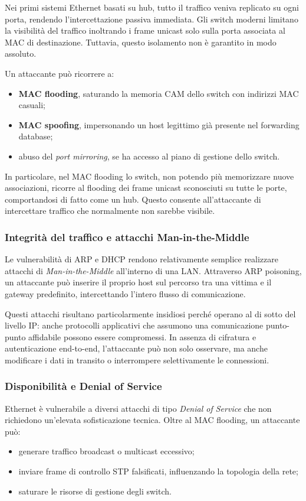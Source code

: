 Nei primi sistemi Ethernet basati su hub, tutto il traffico veniva replicato su ogni porta,
rendendo l’intercettazione passiva immediata.
Gli switch moderni limitano la visibilità del traffico inoltrando i frame unicast
solo sulla porta associata al MAC di destinazione.
Tuttavia, questo isolamento non è garantito in modo assoluto.

Un attaccante può ricorrere a:
\begin{itemize}
  \item \textbf{MAC flooding}, saturando la memoria CAM dello switch con indirizzi MAC casuali;
  \item \textbf{MAC spoofing}, impersonando un host legittimo già presente nel forwarding database;
  \item abuso del \emph{port mirroring}, se ha accesso al piano di gestione dello switch.
\end{itemize}

In particolare, nel MAC flooding lo switch, non potendo più memorizzare nuove associazioni,
ricorre al flooding dei frame unicast sconosciuti su tutte le porte,
comportandosi di fatto come un hub.
Questo consente all’attaccante di intercettare traffico che normalmente non sarebbe visibile.

\subsubsection{Integrità del traffico e attacchi Man-in-the-Middle}

Le vulnerabilità di ARP e DHCP rendono relativamente semplice realizzare attacchi
di \emph{Man-in-the-Middle} all’interno di una LAN.
Attraverso ARP poisoning, un attaccante può inserire il proprio host sul percorso
tra una vittima e il gateway predefinito, intercettando l’intero flusso di comunicazione.

Questi attacchi risultano particolarmente insidiosi perché operano al di sotto del livello IP:
anche protocolli applicativi che assumono una comunicazione punto-punto affidabile
possono essere compromessi.
In assenza di cifratura e autenticazione end-to-end, l’attaccante può non solo osservare,
ma anche modificare i dati in transito o interrompere selettivamente le connessioni.

\subsubsection{Disponibilità e Denial of Service}

Ethernet è vulnerabile a diversi attacchi di tipo \emph{Denial of Service} che non richiedono
un’elevata sofisticazione tecnica.
Oltre al MAC flooding, un attaccante può:
\begin{itemize}
  \item generare traffico broadcast o multicast eccessivo;
  \item inviare frame di controllo STP falsificati, influenzando la topologia della rete;
  \item saturare le risorse di gestione degli switch.
\end{itemize}

